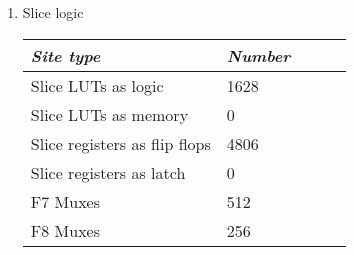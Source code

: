 \documentclass[12pt]{article}
\begin{document}
\begin{enumerate}
\begin{tabular}{ *5l }
\end{tabular}\\\\


\item Slice logic\\


\begin{tabular}{ *5l }    \toprule
\emph{ Site type} & \emph{Number}  \\\midrule
Slice LUTs as logic     & 1628  \\ 
Slice LUTs as memory    &  0 \\
Slice registers as flip flops & 4806\\
Slice registers as latch      & 0 \\
F7 Muxes & 512\\
F8 Muxes & 256\\

\end{tabular}\\\\
\end{enumerate}
\end{document}
